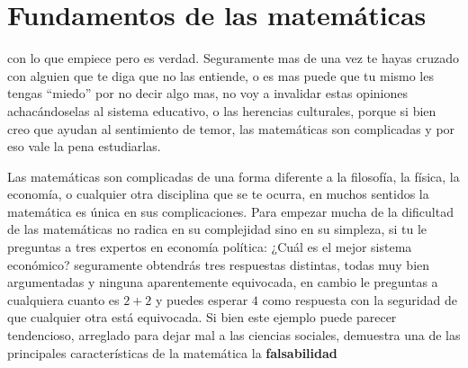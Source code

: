 \chapter{Fundamentos de las matemáticas} %
\label{cha:fundamentos_de_las_matematicas}

\noindent {} con lo
que empiece pero es verdad. Seguramente mas de una vez te hayas cruzado con
alguien que te diga que no las entiende, o es mas puede que tu mismo les tengas
``miedo'' por no decir algo mas, no voy a invalidar estas opiniones
achacándoselas al sistema educativo, o las herencias culturales, porque si bien
creo que ayudan al sentimiento de temor, las matemáticas son complicadas y por
eso vale la pena estudiarlas.

Las matemáticas son complicadas de una forma diferente a la filosofía, la
física, la economía, o cualquier otra disciplina que se te ocurra, en muchos
sentidos la matemática es única en sus complicaciones. Para empezar mucha de la
dificultad de las matemáticas no radica en su complejidad sino en su simpleza,
si tu le preguntas a tres expertos en economía política: ¿Cuál es el mejor
sistema económico? seguramente obtendrás tres respuestas distintas, todas
muy bien argumentadas y ninguna aparentemente equivocada, en cambio le preguntas
a cualquiera cuanto es \(2 + 2\) y puedes esperar \(4\) como respuesta con la
seguridad de que cualquier otra está equivocada. Si bien este ejemplo puede
parecer tendencioso, arreglado para dejar mal a las ciencias sociales, demuestra
una de las principales características de la matemática la \textbf{falsabilidad}

